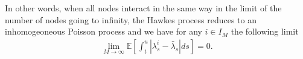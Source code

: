 \documentclass[10pt]{article}
\theoremstyle{plain}
\theoremstyle{definition}
\newcommand{\<}{\langle}
\renewcommand{\>}{\rangle}
\renewcommand{\(}{\left(}
\renewcommand{\)}{\right)}
\renewcommand{\[}{\left[}
\renewcommand{\]}{\right]}
\begin{document}
In other words, when all nodes interact in the same way in the limit of the number of nodes going
to infinity, the Hawkes process reduces to an inhomogeoneous Poisson process and we have for any
$i\in I_{M}$ the following limit
\begin{align}\label{eq:delattre}
\lim\limits_{M\rightarrow\infty}\mathbb{E}\left[\int_t^u|\lambda_s^i-\bar\lambda_s|ds\right]=0.
\end{align}
\end{document}
